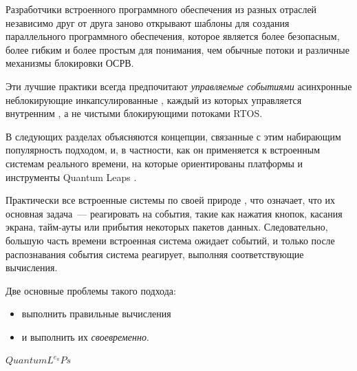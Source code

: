 \label{event}\secdown

\clearpage
Разработчики встроенного программного обеспечения из разных отраслей независимо
друг от друга заново открывают шаблоны для создания параллельного программного
обеспечения, которое является более безопасным, более гибким и более простым для
понимания, чем обычные потоки и различные механизмы блокировки
ОСРВ.

Эти лучшие практики всегда предпочитают \emph{управляемые
событиями} асинхронные
неблокирующие инкапсулированные , каждый из которых
управляется внутренним , а не чистыми блокирующими
потоками RTOS.

В следующих разделах объясняются концепции, связанные с этим набирающим
популярность  подходом, и, в частности, как он применяется к
встроенным системам реального времени, на которые ориентированы платформы и
инструменты Quantum Leaps \cite{psicc2}.

Практически все встроенные системы по своей природе , что
означает, что их основная задача\ --- реагировать на события, такие как нажатия
кнопок, касания экрана, тайм-ауты или прибытия некоторых пакетов данных.
Следовательно, большую часть времени встроенная система ожидает событий, и
только после распознавания события система реагирует, выполняя соответствующие
вычисления.

Две основные проблемы такого подхода:
\begin{itemize}[nosep]
\item выполнить правильные вычисления 
\item и выполнить их \emph{своевременно}.
\end{itemize}

\label{qp}

{\Huge \href{https://www.state-machine.com/}{$QuantumL^{e_a}Ps$}\ \cite{psicc2}}


\secup
